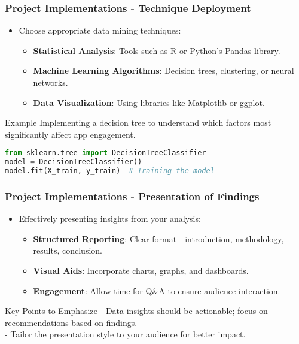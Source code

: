\documentclass[aspectratio=169]{beamer}
\begin{document}
\begin{frame}
    \frametitle{Project Implementations - Technique Deployment}
    \begin{itemize}
        \item Choose appropriate data mining techniques:
        \begin{itemize}
            \item \textbf{Statistical Analysis}: Tools such as R or Python's Pandas library.
            \item \textbf{Machine Learning Algorithms}: Decision trees, clustering, or neural networks.
            \item \textbf{Data Visualization}: Using libraries like Matplotlib or ggplot.
        \end{itemize}
    \end{itemize}
    \begin{block}{Example}
        Implementing a decision tree to understand which factors most significantly affect app engagement.
    \end{block}
    \begin{lstlisting}[language=Python]
from sklearn.tree import DecisionTreeClassifier
model = DecisionTreeClassifier()
model.fit(X_train, y_train)  # Training the model
    \end{lstlisting}
\end{frame}

\begin{frame}
    \frametitle{Project Implementations - Presentation of Findings}
    \begin{itemize}
        \item Effectively presenting insights from your analysis:
        \begin{itemize}
            \item \textbf{Structured Reporting}: Clear format—introduction, methodology, results, conclusion.
            \item \textbf{Visual Aids}: Incorporate charts, graphs, and dashboards.
            \item \textbf{Engagement}: Allow time for Q\&A to ensure audience interaction.
        \end{itemize}
    \end{itemize}
    \begin{block}{Key Points to Emphasize}
        - Data insights should be actionable; focus on recommendations based on findings. \\
        - Tailor the presentation style to your audience for better impact.
    \end{block}
\end{frame}
\end{document}
